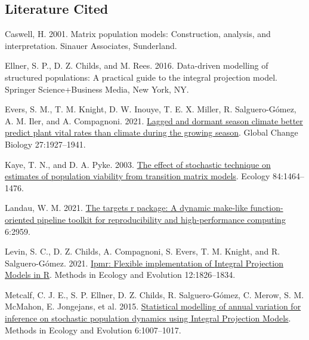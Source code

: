 \documentclass[
]{article}
\newlength{\cslhangindent}
\newlength{\cslentryspacingunit} %
\newenvironment{CSLReferences}[2] %
 {%
  \setlength{\parindent}{0pt}
  \ifodd #1
  \let\oldpar\par
  \def\par{\hangindent=\cslhangindent\oldpar}
  \fi
  \setlength{\parskip}{#2\cslentryspacingunit}
 }%
 {}
\begin{document}
\hypertarget{literature-cited}{%
\subsection{Literature Cited}\label{literature-cited}}

\hypertarget{refs}{}
\begin{CSLReferences}{0}{0}
\leavevmode{}%
Caswell, H. 2001. Matrix population models: Construction, analysis, and
interpretation. Sinauer Associates, Sunderland.

\leavevmode{}%
Ellner, S. P., D. Z. Childs, and M. Rees. 2016. Data-driven modelling of
structured populations: A practical guide to the integral projection
model. {Springer Science+Business Media}, {New York, NY}.

\leavevmode{}%
Evers, S. M., T. M. Knight, D. W. Inouye, T. E. X. Miller, R.
Salguero-Gómez, A. M. Iler, and A. Compagnoni. 2021.
\href{https://doi.org/10.1111/gcb.15519}{Lagged and dormant season
climate better predict plant vital rates than climate during the growing
season}. Global Change Biology 27:1927--1941.

\leavevmode{}%
Kaye, T. N., and D. A. Pyke. 2003.
\href{https://doi.org/10.1890/0012-9658(2003)084\%5B1464:TEOSTO\%5D2.0.CO;2}{The
effect of stochastic technique on estimates of population viability from
transition matrix models}. Ecology 84:1464--1476.

\leavevmode{}%
Landau, W. M. 2021. \href{https://doi.org/10.21105/joss.02959}{The
targets r package: A dynamic make-like function-oriented pipeline
toolkit for reproducibility and high-performance computing} 6:2959.

\leavevmode{}%
Levin, S. C., D. Z. Childs, A. Compagnoni, S. Evers, T. M. Knight, and
R. Salguero-Gómez. 2021.
\href{https://doi.org/10.1111/2041-210X.13683}{Ipmr: {Flexible}
implementation of {Integral Projection Models} in {R}}. Methods in
Ecology and Evolution 12:1826--1834.

\leavevmode{}%
Metcalf, C. J. E., S. P. Ellner, D. Z. Childs, R. Salguero-Gómez, C.
Merow, S. M. McMahon, E. Jongejans, et al. 2015.
\href{https://doi.org/10.1111/2041-210X.12405}{Statistical modelling of
annual variation for inference on stochastic population dynamics using
{Integral Projection Models}}. Methods in Ecology and Evolution
6:1007--1017.


\end{CSLReferences}
\end{document}
